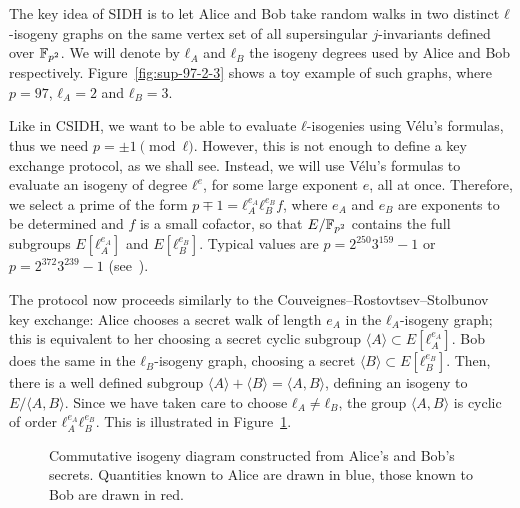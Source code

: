 \documentclass[b5layout]{hdr}
\begin{document}
The key idea of SIDH is to let Alice and Bob take random walks in two
distinct $ℓ$-isogeny graphs on the same vertex set of all
supersingular $j$-invariants defined over $\mathbb{F}_{p^2}$. %
We will denote by $ℓ_A$ and $ℓ_B$ the isogeny degrees used by Alice
and Bob respectively. %
Figure~\ref{fig:sup-97-2-3} shows a toy example of such graphs, where
$p=97$, $ℓ_A=2$ and $ℓ_B=3$. %

Like in CSIDH, we want to be able to evaluate $ℓ$-isogenies using
Vélu's formulas, thus we need $p=±1\pmod{ℓ}$. %
However, this is not enough to define a key exchange protocol, as we
shall see. %
Instead, we will use Vélu's formulas to evaluate an isogeny of degree
$ℓ^e$, for some large exponent $e$, all at once. %
Therefore, we select a prime of the form $p\mp 1=ℓ_A^{e_A}ℓ_B^{e_B}f$,
where $e_A$ and $e_B$ are exponents to be determined and $f$ is a
small cofactor, so that $E/\mathbb{F}_{p^2}$ contains the full subgroups
$E[ℓ_A^{e_A}]$ and $E[ℓ_B^{e_B}]$. %
Typical values are $p = 2^{250}3^{159}-1$ or $p = 2^{372}3^{239}-1$
(see~\cite{SIKE}). %

The protocol now proceeds similarly to the
Couveignes--Rostovtsev--Stolbunov key exchange: Alice chooses a secret
walk of length $e_A$ in the $ℓ_A$-isogeny graph; this is equivalent to
her choosing a secret cyclic subgroup $〈A〉⊂E[ℓ_A^{e_A}]$. %
Bob does the same in the $ℓ_B$-isogeny graph, choosing a secret
$〈B〉⊂E[ℓ_B^{e_B}]$. %
Then, there is a well defined subgroup $〈A〉+〈B〉=〈A,B〉$, defining
an isogeny to $E/〈A,B〉$. %
Since we have taken care to choose $ℓ_A≠ℓ_B$, the group $〈A,B〉$ is
cyclic of order $ℓ_A^{e_A}ℓ_B^{e_B}$. %
This is illustrated in Figure~\ref{fig:sidh-diag}.

\begin{figure}
  \centering
  \caption{Commutative isogeny diagram constructed from Alice's and
    Bob's secrets. %
    Quantities known to Alice are drawn in blue, those known to Bob
    are drawn in red.}
  \label{fig:sidh-diag}
\end{figure}
\end{document}
